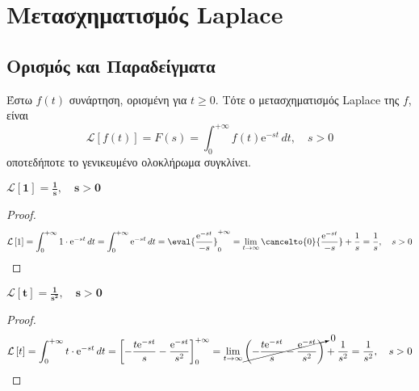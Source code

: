 


\geometry{left=15.63mm,right=15.63mm,top=30.25mm, bottom=36.25mm,footskip=24.16mm,
  headsep=24.16mm}

\pagestyle{vangelis}
\everymath{\displaystyle}

\renewcommand{\qedsymbol}{}

{\topsep}{\topsep}%
{}{}%
{\color{Col1}\bfseries}{}%
{\baselineskip}{}%





\chapter*{Μετασχηματισμός Laplace}

\vspace{\baselineskip}


\section*{Ορισμός και Παραδείγματα}

\begin{dfn}
  Έστω $ f(t) $ συνάρτηση, ορισμένη για $ t \geq 0 $. Τότε ο μετασχηματισμός Laplace 
  της $f$, είναι
  \begin{equation}\label{eq:laplace}
    \mathcal{L} \left[f(t)\right] = F(s) = \int _{0}^{+\infty} f(t) 
    \mathrm{e}^{-st} \,{dt}, \quad s>0
  \end{equation} 
  οποτεδήποτε το γενικευμένο ολοκλήρωμα συγκλίνει.
\end{dfn}

\begin{example}
  $ \boldsymbol{\mathcal{L}\left[1\right] = \frac{1}{s}, \quad s > 0} $
\end{example}
\begin{proof}
  \[
    \mathcal{L}\left[1\right] = \int_{0}^{+\infty} 1\cdot \mathrm{e}^{-st} \,{dt} =  
    \int_{0}^{+\infty} \mathrm{e}^{-st} \,{dt} = \eval{\frac{\mathrm{e}^{-st}}{-s}}
    _{0}^{+\infty} = \lim_{t \to \infty} \cancelto{0}{\frac{\mathrm{e}^{-st}}{-s}} 
    + \frac{1}{s} = \frac{1}{s} , \quad s>0 
  \] 
\end{proof}

\begin{example}
  $ \boldsymbol{\mathcal{L}\left[t\right] = \frac{1}{s^{2}}, \quad s>0} $
\end{example}
\begin{proof}
  \[
    \mathcal{L}\left[t\right] = \int_{0}^{+\infty} t \cdot \mathrm{e}^{-st} \,{dt} = 
    \left[-\frac{t \mathrm{e}^{-st}}{s} - \frac{\mathrm{e}^{-st}}{s^{2}}\right]
    _{0}^{+\infty} = \lim_{t \to \infty} 
    \cancelto{0}{\left(- \frac{t\mathrm{e}^{-st}}{s} -
    \frac{\mathrm{e}^{-st}}{s^{2}}\right)} + \frac{1}{s^{2}} = \frac{1}{s^{2}} , 
    \quad s>0
  \] 
\end{proof}

